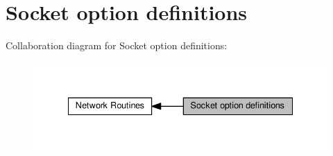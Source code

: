 \hypertarget{group__apr__sockopt}{}\section{Socket option definitions}
\label{group__apr__sockopt}
Collaboration diagram for Socket option definitions\+:
\nopagebreak
\begin{figure}[H]
\begin{center}
\leavevmode
\includegraphics[width=335pt]{group__apr__sockopt}
\end{center}
\end{figure}
